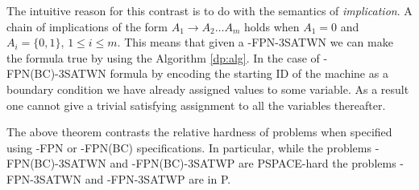  








The intuitive reason for this contrast is to do with the semantics of 
{\em implication}. 
A chain of implications of the form $A_1 \rightarrow A_2 \ldots A_m$ 
holds when $A_1 = 0$ and $ A_i = \{0,1\}$, $ 1 \leq i \leq m$.  
This means that given a {-FPN-3SATWN} 
we can make the formula true by using the Algorithm \ref{dp:alg}.
In the case of {-FPN(BC)-3SATWN} formula by encoding the starting ID 
of the 
machine as a boundary condition we have already assigned values to some 
variable. As a result one cannot give a trivial satisfying assignment to
all the variables thereafter.


The above theorem contrasts the relative hardness of problems when specified
using {-FPN} or 
{-FPN(BC)} specifications. In particular, while the
problems {-FPN(BC)-3SATWN} and 
{-FPN(BC)-3SATWP} are {\sf PSPACE}-hard the problems
{-FPN-3SATWN} and {-FPN-3SATWP} are in {\sf P}.
\fi
